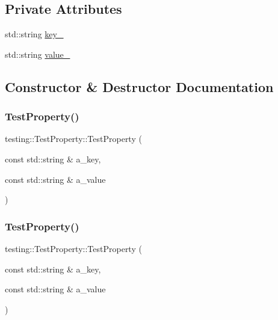 \subsection*{Private Attributes}
\begin{DoxyCompactItemize}
\item 
std\+::string \mbox{\hyperlink{classtesting_1_1_test_property_a948544067d61e790bd37e234186fa708}{key\+\_\+}}
\item 
std\+::string \mbox{\hyperlink{classtesting_1_1_test_property_a204e3793205a1e61412fc34be1913c01}{value\+\_\+}}
\end{DoxyCompactItemize}


\subsection{Constructor \& Destructor Documentation}
\mbox{\label{classtesting_1_1_test_property_a25a0ccf1c75a92af46a48d3c2a873e6d}} 
\subsubsection{\texorpdfstring{TestProperty()}{TestProperty()}\hspace{0.1cm}{\footnotesize\ttfamily [1/3]}}
{\footnotesize\ttfamily testing\+::\+Test\+Property\+::\+Test\+Property (\begin{DoxyParamCaption}\item[{const std\+::string \&}]{a\+\_\+key,  }\item[{const std\+::string \&}]{a\+\_\+value }\end{DoxyParamCaption})\hspace{0.3cm}{\ttfamily [inline]}}

\mbox{\label{classtesting_1_1_test_property_a25a0ccf1c75a92af46a48d3c2a873e6d}} 
\subsubsection{\texorpdfstring{TestProperty()}{TestProperty()}\hspace{0.1cm}{\footnotesize\ttfamily [2/3]}}
{\footnotesize\ttfamily testing\+::\+Test\+Property\+::\+Test\+Property (\begin{DoxyParamCaption}\item[{const std\+::string \&}]{a\+\_\+key,  }\item[{const std\+::string \&}]{a\+\_\+value }\end{DoxyParamCaption})\hspace{0.3cm}{\ttfamily [inline]}}

